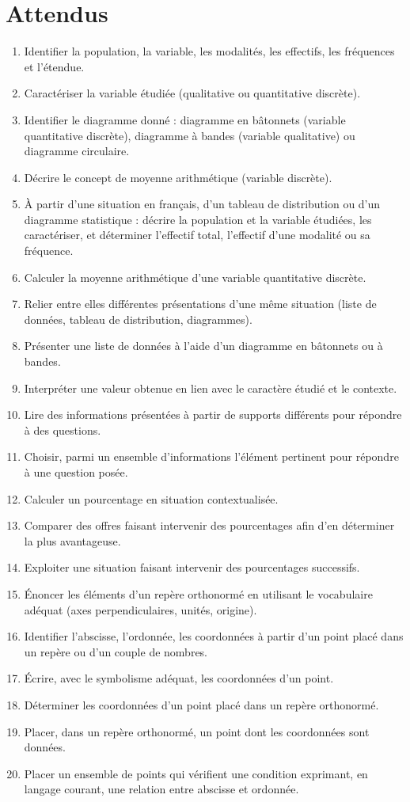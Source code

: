 \documentclass[../../syllabus_1.tex]{subfiles}
\begin{document}
\section*{Attendus}
\begin{enumerate}[label=\textbf{\arabic*.}]
    \item Identifier la population, la variable, les modalités, les effectifs, les fréquences et l'étendue.
    \item Caractériser la variable étudiée (qualitative ou quantitative discrète).
    \item Identifier le diagramme donné : diagramme en bâtonnets (variable quantitative discrète), diagramme à bandes (variable qualitative) ou diagramme circulaire.
    \item Décrire le concept de moyenne arithmétique (variable discrète).
    \item À partir d'une situation en français, d'un tableau de distribution ou d'un diagramme statistique : décrire la population et la variable étudiées, les caractériser, et déterminer l'effectif total, l'effectif d'une modalité ou sa fréquence.
    \item Calculer la moyenne arithmétique d'une variable quantitative discrète.
    \item Relier entre elles différentes présentations d'une même situation (liste de données, tableau de distribution, diagrammes).
    \item Présenter une liste de données à l'aide d'un diagramme en bâtonnets ou à bandes.
    \item Interpréter une valeur obtenue en lien avec le caractère étudié et le contexte.
    \item Lire des informations présentées à partir de supports différents pour répondre à des questions.
    \item Choisir, parmi un ensemble d'informations l'élément pertinent pour répondre à une question posée.
    \item Calculer un pourcentage en situation contextualisée.
    \item Comparer des offres faisant intervenir des pourcentages afin d'en déterminer la plus avantageuse.
    \item Exploiter une situation faisant intervenir des pourcentages successifs.
    \item Énoncer les éléments d'un repère orthonormé en utilisant le vocabulaire adéquat (axes perpendiculaires, unités, origine).
    \item Identifier l'abscisse, l'ordonnée, les coordonnées à partir d'un point placé dans un repère ou d'un couple de nombres.
    \item Écrire, avec le symbolisme adéquat, les coordonnées d'un point.
    \item Déterminer les coordonnées d'un point placé dans un repère orthonormé.
    \item Placer, dans un repère orthonormé, un point dont les coordonnées sont données.
    \item Placer un ensemble de points qui vérifient une condition exprimant, en langage courant, une relation entre abscisse et ordonnée.
\end{enumerate}
\end{document}
